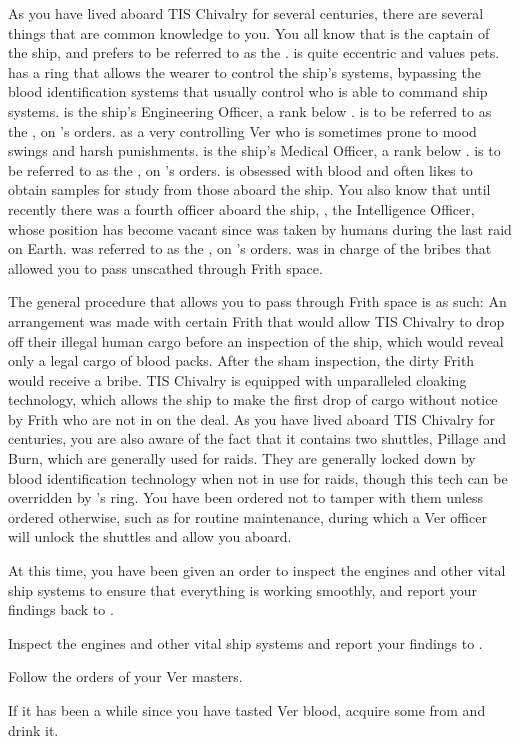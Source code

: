 \documentclass[blue]{guildcamp4}
\begin{document}
As you have lived aboard TIS Chivalry for several centuries, there are several things that are common knowledge to you. You all know that \cVone{} is the captain of the ship, and prefers to be referred to as the \cVone{\Duke}. \cVone{} is quite eccentric and values \cVone{\their} pets. \cVone{} has a ring that allows the wearer to control the ship's systems, bypassing the blood identification systems that usually control who is able to command ship systems. \cVtwo{} is the ship's Engineering Officer, a rank below \cVone{}. \cVtwo{} is to be referred to as the \cVtwo{\Marq}, on \cVone{}'s orders. \cVtwo{} as a very controlling Ver who is sometimes prone to mood swings and harsh punishments. \cVthree{} is the ship's Medical Officer, a rank below \cVtwo{}. \cVthree{} is to be referred to as the \cVthree{\Baron}, on \cVone{}'s orders. \cVthree{} is obsessed with blood and often likes to obtain samples for study from those aboard the ship. You also know that until recently there was a fourth officer aboard the ship, \cIntel{}, the Intelligence Officer, whose position has become vacant since \cIntel{\they} was taken by humans during the last raid on Earth. \cIntel{} was referred to as the \cIntel{\Count}, on \cVone{}'s orders. \cIntel{} was in charge of the bribes that allowed you to pass unscathed through Frith space.

The general procedure that allows you to pass through Frith space is as such: An arrangement was made with certain Frith that would allow TIS Chivalry to drop off their illegal human cargo before an inspection of the ship, which would reveal only a legal cargo of blood packs. After the sham inspection, the dirty Frith would receive a bribe. TIS Chivalry is equipped with unparalleled cloaking technology, which allows the ship to make the first drop of cargo without notice by Frith who are not in on the deal. As you have lived aboard TIS Chivalry for centuries, you are also aware of the fact that it contains two shuttles, Pillage and Burn, which are generally used for raids. They are generally locked down by blood identification technology when not in use for raids, though this tech can be overridden by \cVone{}'s ring. You have been ordered not to tamper with them unless ordered otherwise, such as for routine maintenance, during which a Ver officer will unlock the shuttles and allow you aboard.

At this time, you have been given an order to inspect the engines and other vital ship systems to ensure that everything is working smoothly, and report your findings back to \cVtwo{}.

\begin{itemz}[Goals]
	\item Inspect the engines and other vital ship systems and report your findings to \cVtwo{}.
	\item Follow the orders of your Ver masters.
	\item If it has been a while since you have tasted Ver blood, acquire some from \cVone{} and drink it.
\end{itemz}

\begin{members}
	\member{\cJoan{}} 
	\member{\cJulie{}} 
	\member{\cJames{}} 
	\member{\cRasputin{}} 
\end{members}
\end{document}
